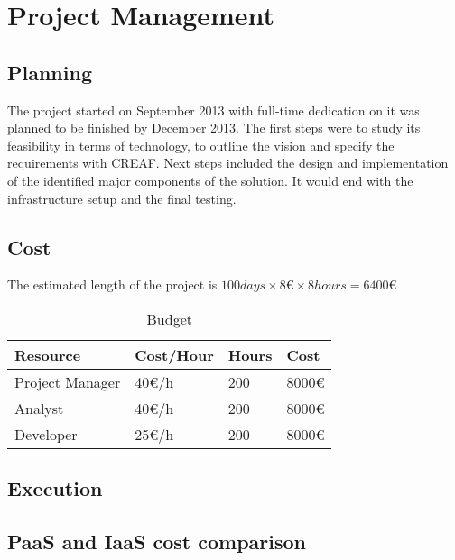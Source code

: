 \chapter{Project Management}

\section{Planning}

The project started on September 2013 with full-time dedication on it was planned to be finished by December 2013. The first steps were to study its feasibility in terms of technology, to outline the vision and specify the requirements with CREAF. Next steps included the design and implementation of the identified major components of the solution. It would end with the infrastructure setup and the final testing.

\section{Cost}

The estimated length of the project is $100 days \times 8 \euro{} \times 8 hours = 6400 \euro{}$

\begin{table}
    \centering
    \begin{tabular}{| l | l | l | l |}
    \hline
    \textbf{Resource}  & \textbf{Cost/Hour}  & \textbf{Hours}  & \textbf{Cost} \\ \hline
    Project Manager    & 40\euro{}/h         & 200             & 8000\euro{}   \\ \hline
    Analyst            & 40\euro{}/h         & 200             & 8000\euro{}   \\ \hline
    Developer          & 25\euro{}/h         & 200             & 8000\euro{}   \\ \hline
    \end{tabular}
    \caption{Budget}
    \label{tab:budget}
\end{table}

\section{Execution}

\section{PaaS and IaaS cost comparison}
